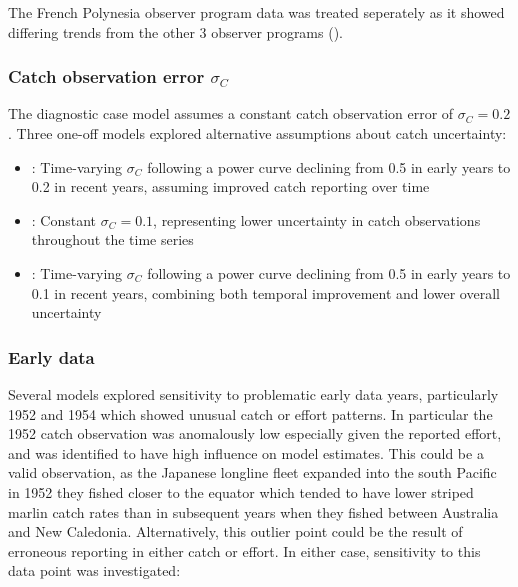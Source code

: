 \documentclass[
  11pt,
]{SCreport}
\providecommand{\tightlist}{%
  \setlength{\itemsep}{0pt}\setlength{\parskip}{0pt}}\usepackage{longtable,booktabs,array}
\begin{document}
The French Polynesia observer program data was treated seperately as it
showed differing trends from the other 3 observer programs
().

\subsubsection{\texorpdfstring{Catch observation error
\(\sigma_C\)}{Catch observation error \textbackslash sigma\_C}}\label{sec-desc-sens-sigmac}

The diagnostic case model assumes a constant catch observation error of
\(\sigma_C = 0.2\). Three one-off models explored alternative
assumptions about catch uncertainty:

\begin{itemize}
\tightlist
\item
  : Time-varying \(\sigma_C\) following a power curve
  declining from 0.5 in early years to 0.2 in recent years, assuming
  improved catch reporting over time
\item
  : Constant \(\sigma_C = 0.1\), representing lower
  uncertainty in catch observations throughout the time series
\item
  : Time-varying \(\sigma_C\) following a power curve
  declining from 0.5 in early years to 0.1 in recent years, combining
  both temporal improvement and lower overall uncertainty
\end{itemize}

\subsubsection{Early data}\label{sec-desc-sens-early}

Several models explored sensitivity to problematic early data years,
particularly 1952 and 1954 which showed unusual catch or effort
patterns. In particular the 1952 catch observation was anomalously low
especially given the reported effort, and was identified to have high
influence on model estimates. This could be a valid observation, as the
Japanese longline fleet expanded into the south Pacific in 1952 they
fished closer to the equator which tended to have lower striped marlin
catch rates than in subsequent years when they fished between Australia
and New Caledonia. Alternatively, this outlier point could be the result
of erroneous reporting in either catch or effort. In either case,
sensitivity to this data point was investigated:
\end{document}
